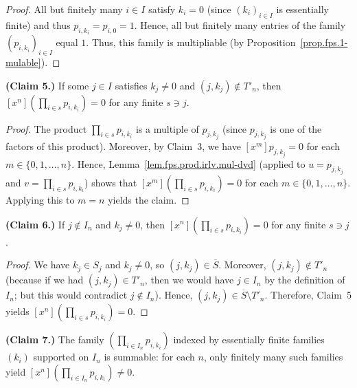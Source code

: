 \begin{proof}
\leanok
All but finitely many $i \in I$ satisfy $k_i = 0$ (since $(k_i)_{i \in I}$
is essentially finite) and thus $p_{i,k_i} = p_{i,0} = 1$.
Hence, all but finitely many entries of the family $(p_{i,k_i})_{i \in I}$
equal $1$. Thus, this family is multipliable (by
Proposition~\ref{prop.fps.1-mulable}).
\end{proof}

\begin{lemma}
\label{lem.fps.infprod.claim5}
\leanhelper
\leanok
\textbf{(Claim 5.)}
If some $j \in I$ satisfies $k_j \neq 0$ and $(j, k_j) \notin T'_n$, then
$[x^n](\prod_{i \in s} p_{i,k_i}) = 0$ for any finite $s \ni j$.
\end{lemma}

\begin{proof}
\leanok
The product $\prod_{i \in s} p_{i,k_i}$ is a multiple of $p_{j,k_j}$
(since $p_{j,k_j}$ is one of the factors of this product).
Moreover, by Claim~3, we have $[x^m] p_{j,k_j} = 0$ for each
$m \in \{0,1,\ldots,n\}$.
Hence, Lemma~\ref{lem.fps.prod.irlv.mul-dvd} (applied to $u = p_{j,k_j}$
and $v = \prod_{i \in s} p_{i,k_i}$) shows that
$[x^m](\prod_{i \in s} p_{i,k_i}) = 0$ for each $m \in \{0,1,\ldots,n\}$.
Applying this to $m = n$ yields the claim.
\end{proof}

\begin{lemma}
\label{lem.fps.infprod.claim6}
\leanhelper
\leanok
\textbf{(Claim 6.)}
If $j \notin I_n$ and $k_j \neq 0$, then
$[x^n](\prod_{i \in s} p_{i,k_i}) = 0$ for any finite $s \ni j$.
\end{lemma}

\begin{proof}
\leanok
We have $k_j \in S_j$ and $k_j \neq 0$, so $(j, k_j) \in \overline{S}$.
Moreover, $(j, k_j) \notin T'_n$ (because if we had
$(j, k_j) \in T'_n$, then we would have $j \in I_n$ by the
definition of $I_n$; but this would contradict $j \notin I_n$).
Hence, $(j, k_j) \in \overline{S} \setminus T'_n$.
Therefore, Claim~5 yields $[x^n](\prod_{i \in s} p_{i,k_i}) = 0$.
\end{proof}

\begin{lemma}
\label{lem.fps.infprod.claim7}
\leanhelper
\leanok
\textbf{(Claim 7.)}
The family $(\prod_{i \in I_n} p_{i,k_i})$ indexed by essentially finite
families $(k_i)$ supported on $I_n$ is summable: for each $n$, only finitely
many such families yield $[x^n](\prod_{i \in I_n} p_{i,k_i}) \neq 0$.
\end{lemma}

